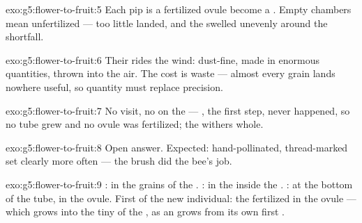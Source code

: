 \begin{solution}{exo:g5:flower-to-fruit:5}
Each pip is a fertilized ovule become a . Empty chambers
mean unfertilized  --- too little  landed, and
the  swelled unevenly around the shortfall.
\end{solution}

\begin{solution}{exo:g5:flower-to-fruit:6}
Their  rides the wind: dust-fine, made in enormous
quantities, thrown into the air. The cost is waste ---
almost every grain lands nowhere useful, so quantity must
replace precision.
\end{solution}

\begin{solution}{exo:g5:flower-to-fruit:7}
No visit, no  on the  --- , the first
step, never happened, so no tube grew and no ovule was
fertilized; the  withers whole.
\end{solution}

\begin{solution}{exo:g5:flower-to-fruit:8}
Open answer. Expected: hand-pollinated, thread-marked 
set  clearly more often --- the brush did the bee's job.
\end{solution}

\begin{solution}{exo:g5:flower-to-fruit:9}
 : in the  grains of the . :
in the  inside the . : at the bottom
of the  tube, in the ovule. First  of the new
individual: the fertilized  in the ovule --- which
grows into the tiny  of the , as an  grows
from its own first .
\end{solution}

